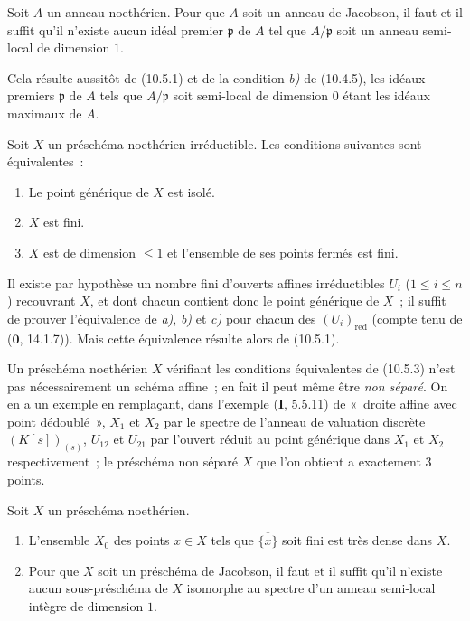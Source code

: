 \begin{corollary}[10.5.2]
\label{IV.10.5.2-fr}
Soit $A$ un anneau noethérien. Pour que $A$ soit un anneau de Jacobson, il faut
et il suffit qu'il n'existe aucun idéal premier $\mathfrak p$ de $A$ tel que
$A/\mathfrak p$ soit un anneau semi-local de dimension $1$.
\end{corollary}

Cela résulte aussitôt de (10.5.1) et de la condition \emph{b)} de (10.4.5),
les idéaux premiers $\mathfrak p$ de $A$ tels que $A/\mathfrak p$ soit
semi-local de dimension $0$ étant les idéaux maximaux de $A$.

\begin{corollary}[10.5.3]
\label{IV.10.5.3-fr}
Soit $X$ un préschéma noethérien irréductible. Les conditions suivantes sont
équivalentes~:
\begin{enumerate}[label=\emph{\alph*)}]
  \item Le point générique de $X$ est isolé.
  \item $X$ est fini.
  \item $X$ est de dimension $\leq1$ et l'ensemble de ses points fermés est
  fini.
\end{enumerate}
\end{corollary}

Il existe par hypothèse un nombre fini d'ouverts affines irréductibles $U_i$
($1\leq i\leq n$) recouvrant $X$, et dont chacun contient donc le point
générique de $X$~; il suffit de prouver l'équivalence de \emph{a)}, \emph{b)}
et \emph{c)} pour chacun des $(U_i)_{\mathrm{red}}$ (compte tenu de
($\mathbf 0$, 14.1.7)). Mais cette équivalence résulte alors de (10.5.1).

\begin{remark}[10.5.4]
\label{IV.10.5.4-fr}
Un préschéma noethérien $X$ vérifiant les conditions équivalentes de (10.5.3)
n'est pas nécessairement un schéma affine~; en fait il peut même être
\emph{non séparé}. On en a un exemple en remplaçant, dans l'exemple
(\textbf{I}, 5.5.11) de «~droite affine avec point dédoublé~», $X_1$ et $X_2$
par le spectre de l'anneau de valuation discrète $(K[s])_{(s)}$, $U_{12}$ et
$U_{21}$ par l'ouvert réduit au point générique dans $X_1$ et $X_2$
respectivement~; le préschéma non séparé $X$ que l'on obtient a exactement
$3$ points.
\end{remark}

\begin{proposition}[10.5.5]
\label{IV.10.5.5-fr}
Soit $X$ un préschéma noethérien.
\begin{enumerate}[label=\textup{(\roman*)}]
  \item L'ensemble $X_0$ des points $x\in X$ tels que $\overline{\{x\}}$ soit
  fini est très dense dans $X$.
  \item Pour que $X$ soit un préschéma de Jacobson, il faut et il suffit qu'il
  n'existe aucun sous-préschéma de $X$ isomorphe au spectre d'un anneau
  semi-local intègre de dimension $1$.
\end{enumerate}
\end{proposition}

